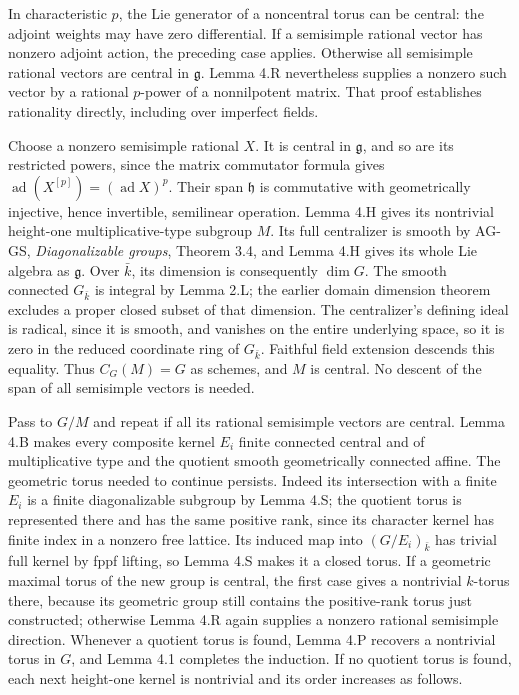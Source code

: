\documentclass[11pt,a4paper,openany]{report}
\begin{document}
In characteristic \(p\), the Lie generator of a noncentral torus can be central: the adjoint weights may have zero differential. If a semisimple rational vector has nonzero adjoint action, the preceding case applies. Otherwise all semisimple rational vectors are central in \(\mathfrak g\). Lemma 4.R nevertheless supplies a nonzero such vector by a rational \(p\)-power of a nonnilpotent matrix. That proof establishes rationality directly, including over imperfect fields.

Choose a nonzero semisimple rational \(X\). It is central in \(\mathfrak g\), and so are its restricted powers, since the matrix commutator formula gives \(\operatorname{ad}(X^{[p]})=(\operatorname{ad}X)^p\). Their span \(\mathfrak h\) is commutative with geometrically injective, hence invertible, semilinear operation. Lemma 4.H gives its nontrivial height-one multiplicative-type subgroup \(M\). Its full centralizer is smooth by AG-GS, \emph{Diagonalizable groups}, Theorem 3.4, and Lemma 4.H gives its whole Lie algebra as \(\mathfrak g\). Over \(\bar k\), its dimension is consequently \(\dim G\). The smooth connected \(G_{\bar k}\) is integral by Lemma 2.L; the earlier domain dimension theorem excludes a proper closed subset of that dimension. The centralizer's defining ideal is radical, since it is smooth, and vanishes on the entire underlying space, so it is zero in the reduced coordinate ring of \(G_{\bar k}\). Faithful field extension descends this equality. Thus \(C_G(M)=G\) as schemes, and \(M\) is central. No descent of the span of all semisimple vectors is needed.

Pass to \(G/M\) and repeat if all its rational semisimple vectors are central. Lemma 4.B makes every composite kernel \(E_i\) finite connected central and of multiplicative type and the quotient smooth geometrically connected affine. The geometric torus needed to continue persists. Indeed its intersection with a finite \(E_i\) is a finite diagonalizable subgroup by Lemma 4.S; the quotient torus is represented there and has the same positive rank, since its character kernel has finite index in a nonzero free lattice. Its induced map into \((G/E_i)_{\bar k}\) has trivial full kernel by fppf lifting, so Lemma 4.S makes it a closed torus. If a geometric maximal torus of the new group is central, the first case gives a nontrivial \(k\)-torus there, because its geometric group still contains the positive-rank torus just constructed; otherwise Lemma 4.R again supplies a nonzero rational semisimple direction. Whenever a quotient torus is found, Lemma 4.P recovers a nontrivial torus in \(G\), and Lemma 4.1 completes the induction. If no quotient torus is found, each next height-one kernel is nontrivial and its order increases as follows.
\end{document}
